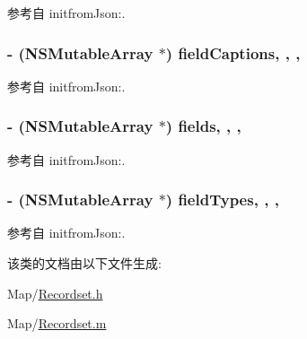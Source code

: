 参考自 initfrom\-Json\-:.

\hypertarget{interface_recordset_aa6c80a7cd4d52f37f5e840fa7ca85210}{
\subsubsection[{field\-Captions}]{\setlength{\rightskip}{0pt plus 5cm}-\/ (N\-S\-Mutable\-Array $\ast$) field\-Captions\hspace{0.3cm}{\ttfamily [read]}, {\ttfamily [write]}, {\ttfamily [atomic]}, {\ttfamily [retain]}}}\label{interface_recordset_aa6c80a7cd4d52f37f5e840fa7ca85210}


参考自 initfrom\-Json\-:.

\hypertarget{interface_recordset_ae20147a35c4cb7ef4601143e905472c8}{
\subsubsection[{fields}]{\setlength{\rightskip}{0pt plus 5cm}-\/ (N\-S\-Mutable\-Array $\ast$) fields\hspace{0.3cm}{\ttfamily [read]}, {\ttfamily [write]}, {\ttfamily [atomic]}, {\ttfamily [retain]}}}\label{interface_recordset_ae20147a35c4cb7ef4601143e905472c8}


参考自 initfrom\-Json\-:.

\hypertarget{interface_recordset_a08619b9dcb3f4bd54d8fb3c0a1059d85}{
\subsubsection[{field\-Types}]{\setlength{\rightskip}{0pt plus 5cm}-\/ (N\-S\-Mutable\-Array $\ast$) field\-Types\hspace{0.3cm}{\ttfamily [read]}, {\ttfamily [write]}, {\ttfamily [atomic]}, {\ttfamily [retain]}}}\label{interface_recordset_a08619b9dcb3f4bd54d8fb3c0a1059d85}


参考自 initfrom\-Json\-:.



该类的文档由以下文件生成\-:\begin{DoxyCompactItemize}
\item 
Map/\hyperlink{_recordset_8h}{Recordset.\-h}\item 
Map/\hyperlink{_recordset_8m}{Recordset.\-m}\end{DoxyCompactItemize}
